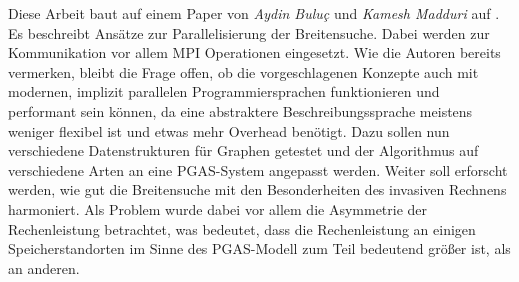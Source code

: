 Diese Arbeit baut auf einem Paper von \textit{Aydin Buluç} und \textit{Kamesh Madduri} auf \cite{Buluc:2011}. Es beschreibt Ansätze zur Parallelisierung der Breitensuche. Dabei werden zur Kommunikation vor allem MPI Operationen eingesetzt. Wie die Autoren bereits vermerken, bleibt die Frage offen, ob die vorgeschlagenen Konzepte auch mit modernen, implizit parallelen Programmiersprachen funktionieren und performant sein können, da eine abstraktere Beschreibungssprache meistens weniger flexibel ist und etwas mehr Overhead benötigt. Dazu sollen nun verschiedene Datenstrukturen für Graphen getestet und der Algorithmus auf verschiedene Arten an eine PGAS-System angepasst werden. Weiter soll erforscht werden, wie gut die Breitensuche mit den Besonderheiten des invasiven Rechnens harmoniert. Als Problem wurde dabei vor allem die Asymmetrie der Rechenleistung betrachtet, was bedeutet, dass die Rechenleistung an einigen Speicherstandorten im Sinne des PGAS-Modell zum Teil bedeutend größer ist, als an anderen.